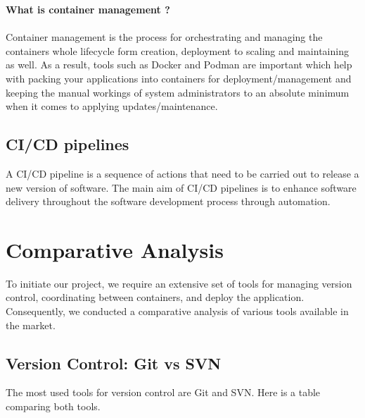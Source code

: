 \textbf{What is container management ?}
\paragraph*{}
Container management is the process for orchestrating and managing the containers whole lifecycle form creation, deployment to scaling and maintaining as well. As a result, tools such as Docker and  Podman are important which help with packing your applications into containers for deployment/management and keeping the manual workings of system administrators to an absolute minimum when it comes to applying updates/maintenance.

\subsection{CI/CD pipelines}
A CI/CD pipeline is a sequence of actions that need to be carried out to release a new version of software. The main aim of CI/CD pipelines is to enhance software delivery throughout the software development process through automation.


\section{Comparative Analysis}
To initiate our project, we require an extensive set of tools for managing version control, coordinating between containers, and deploy the application. Consequently, we conducted a comparative analysis of various tools available in the market.

\subsection{Version Control: Git vs SVN}
The most used tools for version control are Git and SVN. Here is a table
comparing both tools.



